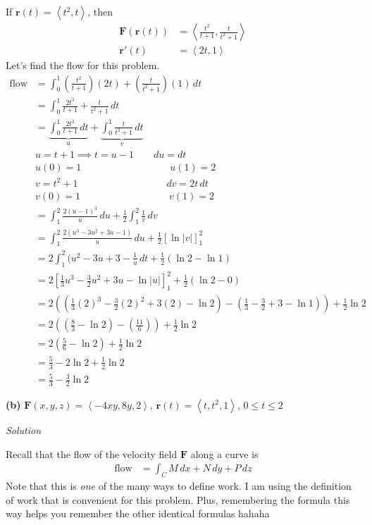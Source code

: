 \documentclass{article}
\newcommand{\lrp}[1]{\left( #1 \right)}
\newcommand{\lra}[1]{\left\langle #1 \right\rangle}
\newcommand{\lrb}[1]{\left[ #1 \right]}
\renewcommand{\r}[0]{\mathbf{r}}
\newcommand{\F}[0]{\mathbf{F}}
\newcommand{\Solution}{\textit{Solution}}
\begin{document}
If $\r(t)=\lra{t^2,t}$, then
\begin{align*}
    \F\lrp{\r(t)}&=\lra{\frac{t^2}{t+1},\frac{t}{t^2+1}}\\
    \r'(t)&=\lra{2t,1}
\end{align*}
Let's find the flow for this problem.
\begin{align*}
    \text{flow}&=\int_0^1 \lrp{\frac{t^2}{t+1}}\lrp{2t}+\lrp{\frac{t}{t^2+1}}\lrp{1}\,dt\\
    &=\int_0^1 \frac{2t^3}{t+1}+\frac{t}{t^2+1}\,dt\\
    &=\underbrace{\int_0^1 \frac{2t^3}{t+1}\,dt}_{u} + \underbrace{\int_0^1 \frac{t}{t^2+1}\,dt}_{v}\\
    &u=t+1\implies t=u-1\hspace{2em}du=dt\\
    &u(0)=1\hspace{9em}u(1)=2\\
    &v=t^2+1\hspace{9em}dv=2t\,dt\\
    &v(0)=1\hspace{9em}v(1)=2\\
    &=\int_1^2 \frac{2(u-1)^3}{u}\,du+\frac{1}{2}\int_1^2 \frac{1}{v}\,dv\\
    &=\int_1^2 \frac{2(u^3-3u^2+3u-1)}{u}\,du+\frac{1}{2}\lrb{\ln \left |v\right|}_1^2\\
    &=2\int_1^2 (u^2 - 3u+3-\frac{1}{u}\,dt+\frac{1}{2}\lrp{\ln 2 - \ln 1}\\
    &=2\lrb{\frac{1}{3}u^3-\frac{3}{2}u^2+3u-\ln \left|u\right|}_1^2 + \frac{1}{2}\lrp{\ln 2 - 0}\\
    &=2\lrp{\lrp{\frac{1}{3}(2)^3 -\frac{3}{2}(2)^2+3(2)-\ln 2}-\lrp{\frac{1}{3}-\frac{3}{2}+3-\ln 1}}+\frac{1}{2}\ln 2\\
    &=2\lrp{\lrp{\frac{8}{3}-\ln 2}-\lrp{\frac{11}{6}}}+\frac{1}{2}\ln 2\tag{use a calculator}\\
    &=2\lrp{\frac{5}{6}-\ln 2}+\frac{1}{2}\ln 2\tag{use a calculator again...}\\
    &=\frac{5}{3}-2\ln 2 + \frac{1}{2}\ln 2\\
    &=\boxed{\frac{5}{3}-\frac{3}{2}\ln 2}
\end{align*}

{}\textbf{(b)} $\displaystyle\F(x,y,z)=\lra{-4xy,8y,2}$, $\r(t)=\lra{t,t^2,1}$, $0\leq t\leq 2$

\Solution

Recall that the flow of the velocity field $\F$ along a curve is
\begin{align*}
    \text{flow}&=\int_C M\,dx + N\,dy+ P\,dz
\end{align*}
Note that this is \textit{one} of the many ways to define work. I am using the definition of work that is convenient for this problem. Plus, remembering the formula this way helps you remember the other identical formulas hahaha
\end{document}
